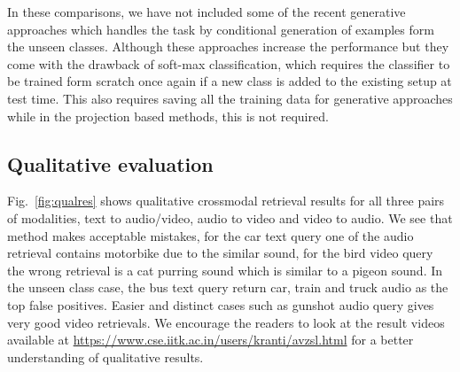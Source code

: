  In these comparisons, we have not included some of the recent generative approaches \cite{verma2018generalized, xian2018feature} which handles the task by conditional generation of examples form the unseen classes. Although these approaches increase the performance but they come with the drawback of soft-max classification, which requires the classifier to be trained form scratch once again if a new class is added to the existing setup at test time. This also requires saving all the training data for generative approaches while in the projection based methods, this is not required. 
 

 \subsection{Qualitative evaluation}
 Fig.~\ref{fig:qualres} shows qualitative crossmodal retrieval results for all three pairs of modalities, \ie text to audio/video, audio to video and video to audio. We see that method makes acceptable mistakes, \eg for the car text query one of the audio retrieval contains motorbike due to the similar sound, for the bird video query the wrong retrieval is a cat purring sound which is similar to a pigeon sound. In the unseen class case, the bus text query return car, train and truck audio as the top false positives. Easier and distinct cases such as gunshot audio query gives very good video retrievals. We encourage the readers to look at the result videos available at \url{https://www.cse.iitk.ac.in/users/kranti/avzsl.html} for a better understanding of qualitative results. 
